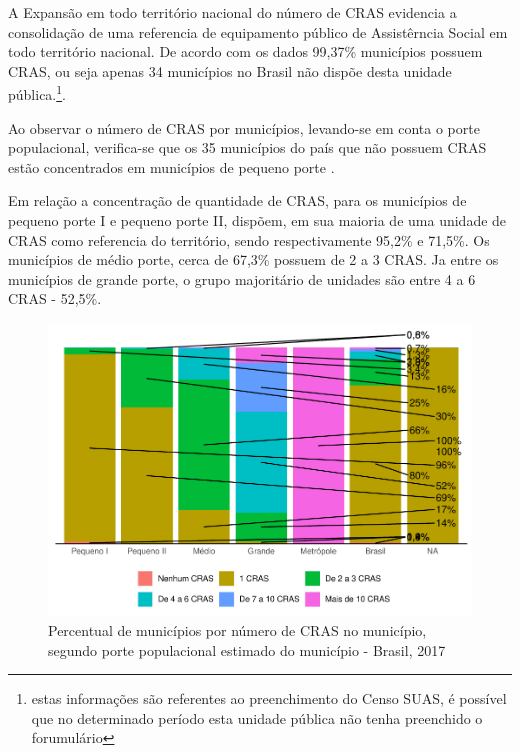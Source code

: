 \documentclass[
  brazilian]{report}
\begin{document}
A Expansão em todo território nacional do número de CRAS evidencia a
consolidação de uma referencia de equipamento público de Assistêrncia
Social em todo território nacional. De acordo com os dados 99,37\%
municípios possuem CRAS, ou seja apenas 34 municípios no Brasil não
dispõe desta unidade
pública.\footnote{estas informações são referentes ao preenchimento do Censo SUAS, é possível que no determinado período esta unidade pública não tenha preenchido o forumulário}.

Ao observar o número de CRAS por municípios, levando-se em conta o porte
populacional, verifica-se que os 35 municípios do país que não possuem
CRAS estão concentrados em municípios de pequeno porte
.

Em relação a concentração de quantidade de CRAS, para os municípios de
pequeno porte I e pequeno porte II, dispõem, em sua maioria de uma
unidade de CRAS como referencia do território, sendo respectivamente
95,2\% e 71,5\%. Os municípios de médio porte, cerca de 67,3\% possuem
de 2 a 3 CRAS. Ja entre os municípios de grande porte, o grupo
majoritário de unidades são entre 4 a 6 CRAS - 52,5\%.

\begin{figure}
\includegraphics{Censo-SUAS-2022_files/figure-latex/CRAS-porte-1} \caption[Percentual de municípios por número de CRAS no município, segundo porte populacional estimado do município - Brasil, 2017]{Percentual de municípios por número de CRAS no município, segundo porte populacional estimado do município - Brasil, 2017}\label{fig:CRAS-porte}
\end{figure}
\end{document}
